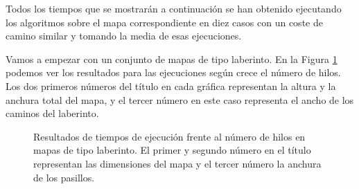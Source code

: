 \documentclass[a4paper,12pt]{article}
\begin{document}
Todos los tiempos que se mostrarán a continuación se han obtenido ejecutando los algoritmos sobre el mapa correspondiente en diez casos con un coste de camino similar y tomando la media de esas ejecuciones.

Vamos a empezar con un conjunto de mapas de tipo laberinto. En la Figura \ref{mazes} podemos ver los resultados para las ejecuciones según crece el número de hilos. Los dos primeros números del título en cada gráfica representan la altura y la anchura total del mapa, y el tercer número en este caso representa el ancho de los caminos del laberinto.

\begin{figure}[H]
    \centering
    \begin{subfigure}[b]{0.49\textwidth}
        
    \end{subfigure}
    \hfill
    \begin{subfigure}[b]{0.49\textwidth}
        
    \end{subfigure}

    \vspace{0.3em}
    
    \begin{subfigure}[b]{0.49\textwidth}
        
    \end{subfigure}
    \hfill
    \begin{subfigure}[b]{0.49\textwidth}
        
    \end{subfigure}

    \vspace{0.3em}

    \begin{subfigure}[b]{0.49\textwidth}
        
    \end{subfigure}
    \hfill
    \begin{subfigure}[b]{0.49\textwidth}
        
    \end{subfigure}

    \vspace{0.3em}

    \begin{subfigure}[b]{0.49\textwidth}
        
    \end{subfigure}

    \caption{Resultados de tiempos de ejecución frente al número de hilos en mapas de tipo laberinto. El primer y segundo número en el título representan las dimensiones del mapa y el tercer número la anchura de los pasillos.}
    \label{mazes}
\end{figure}
\end{document}
